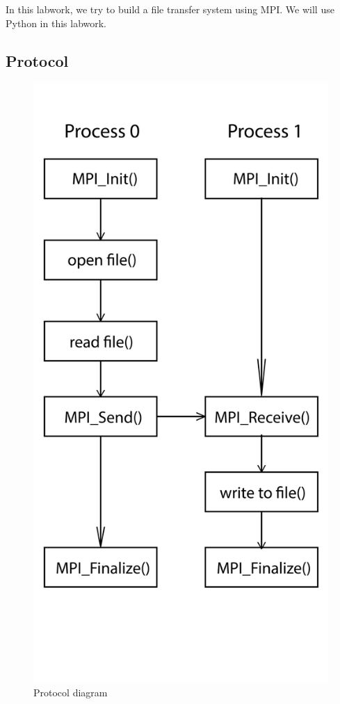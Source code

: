 \documentclass[13pt]{article}
\begin{document}
\noindent%
In this labwork, we try to build a file transfer system using MPI. We will use Python in this labwork.

\subsection{Protocol}

\begin{figure}[h]
    \centering
    \includegraphics[scale=0.1]{protocol-diagram-01.png}
    \caption{Protocol diagram}
    \label{fig:protocol}
\end{figure}
\end{document}

